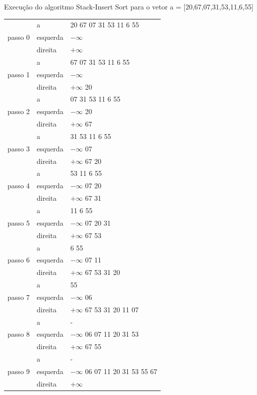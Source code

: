 \begin{exemplo}
Execução do algoritmo Stack-Insert Sort para o vetor a = [20,67,07,31,53,11,6,55]

\begin{tabular}{lll}
\hline
         & a        &   20 67 07 31 53 11 6 55        \\
passo 0  &   esquerda & $-\infty$                                \\
         & direita  & $+\infty$\\
\hline
         & a        &   67 07 31 53 11 6 55        \\
passo 1  &   esquerda & $-\infty$                                \\
         & direita  & $+\infty$ 20\\
\hline
         & a        &   07 31 53 11 6 55        \\
passo 2  &   esquerda & $-\infty$ 20                               \\
         & direita  & $+\infty$ 67\\
\hline
         & a        &   31 53 11 6 55        \\
passo 3  &   esquerda & $-\infty$ 07                                \\
         & direita  & $+\infty$ 67 20\\
\hline
         & a        &   53 11 6 55        \\
passo 4  &   esquerda & $-\infty$ 07 20                               \\
         & direita  & $+\infty$ 67 31\\
\hline
         & a        &   11 6 55        \\
passo 5  &   esquerda & $-\infty$ 07 20 31                               \\
         & direita  & $+\infty$ 67 53\\
\hline
         & a        &   6 55        \\
passo 6  &   esquerda & $-\infty$ 07 11                                \\
         & direita  & $+\infty$ 67 53 31 20 \\
\hline
         & a        &   55        \\
passo 7  &   esquerda & $-\infty$ 06                                \\
         & direita  & $+\infty$ 67 53 31 20 11 07\\
\hline
         & a        &   -        \\
passo 8  &   esquerda & $-\infty$ 06 07 11 20 31 53                                 \\
         & direita  & $+\infty$ 67 55\\
\hline
         & a        &   -        \\
passo 9  &   esquerda & $-\infty$ 06 07 11 20 31 53 55 67                                 \\
         & direita  & $+\infty$ \\
\hline

\end{tabular}
\end{exemplo}
